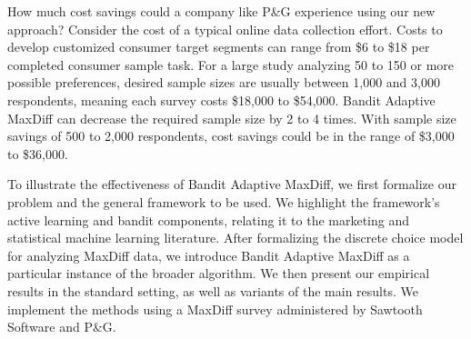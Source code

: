 \documentclass[a4paper,11pt]{article}
\newcommand{\eric}[1]{\textcolor{red}{\textbf{(eric)} #1}}
\begin{document}
How much cost savings could a company like P\&G experience using our new approach? Consider the cost of a typical online data collection effort. Costs to develop customized consumer target segments can range from \$6 to \$18 per completed consumer sample task. For a large study analyzing 50 to 150 or more possible preferences, desired sample sizes are usually between 1,000 and 3,000 respondents, meaning each survey costs \$18,000 to \$54,000. Bandit Adaptive MaxDiff can decrease the required sample size by 2 to 4 times. With sample size savings of 500 to 2,000 respondents, cost savings could be in the range of \$3,000 to \$36,000.

To illustrate the effectiveness of Bandit Adaptive MaxDiff, we first formalize our problem and the general framework to be used. We highlight the framework's active learning and bandit components, relating it to the marketing and statistical machine learning literature. After formalizing the discrete choice model for analyzing MaxDiff data, we introduce Bandit Adaptive MaxDiff as a particular instance of the broader algorithm. We then present our empirical results in the standard setting, as well as variants of the main results. We implement the methods using a MaxDiff survey administered by Sawtooth Software and P\&G. 











\end{document}

